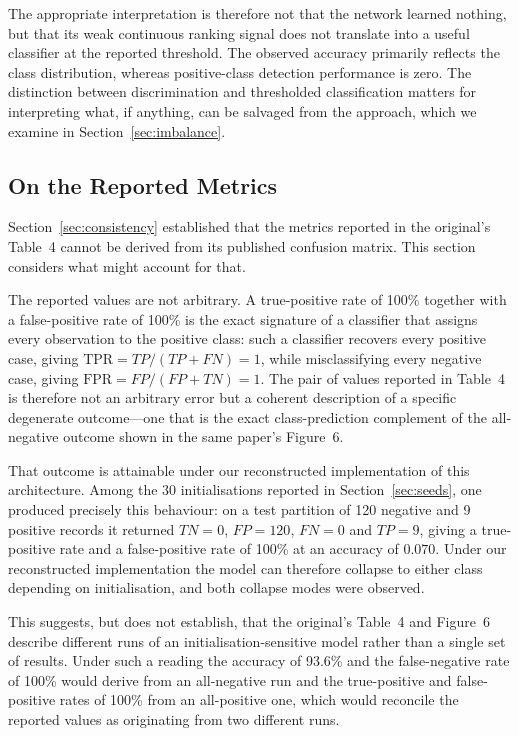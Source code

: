The appropriate interpretation is therefore not that the network learned
nothing, but that its weak continuous ranking signal does not translate into a
useful classifier at the reported threshold. The observed accuracy primarily
reflects the class distribution, whereas positive-class detection performance
is zero. The distinction between discrimination and thresholded classification
matters for interpreting what, if anything, can be salvaged from the approach,
which we examine in Section~\ref{sec:imbalance}.

\subsection{On the Reported Metrics}\label{sec:metrics-discussion}

Section~\ref{sec:consistency} established that the metrics reported in the
original's Table~4 cannot be derived from its published confusion matrix. This
section considers what might account for that.

The reported values are not arbitrary. A true-positive rate of 100\% together
with a false-positive rate of 100\% is the exact signature of a classifier that
assigns every observation to the positive class: such a classifier recovers
every positive case, giving $\mathrm{TPR} = TP/(TP+FN) = 1$, while
misclassifying every negative case, giving $\mathrm{FPR} = FP/(FP+TN) = 1$. The
pair of values reported in Table~4 is therefore not an arbitrary error but a
coherent description of a specific degenerate outcome---one that is the exact
class-prediction complement of the all-negative outcome shown in the same
paper's Figure~6.

That outcome is attainable under our reconstructed implementation of this
architecture. Among the 30 initialisations reported in
Section~\ref{sec:seeds}, one produced precisely this behaviour: on a test
partition of 120 negative and 9 positive records it returned $TN = 0$,
$FP = 120$, $FN = 0$ and $TP = 9$, giving a true-positive rate and a
false-positive rate of 100\% at an accuracy of $0.070$. Under our reconstructed
implementation the model can therefore collapse to either class depending on
initialisation, and both collapse modes were observed.

This suggests, but does not establish, that the original's Table~4 and Figure~6
describe different runs of an initialisation-sensitive model rather than a
single set of results. Under such a reading the accuracy of 93.6\% and the
false-negative rate of 100\% would derive from an all-negative run and the
true-positive and false-positive rates of 100\% from an all-positive one, which
would reconcile the reported values as originating from two different runs.

